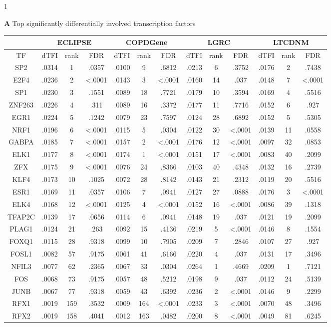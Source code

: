 \documentclass[9pt,twocolumn,twoside]{pnas-new}
\begin{document}
\begin{table}
1
\begin{widetext}

\textbf{A} Top significantly differentially involved transcription factors

\begin{tabular}{|c||c|c|c||c|c|c||c|c|c||c|c|c|}
\cline{2-13} 
\multicolumn{1}{c|}{} & \multicolumn{3}{c||}{ECLIPSE} & \multicolumn{3}{c||}{COPDGene} & \multicolumn{3}{c||}{LGRC} & \multicolumn{3}{c|}{LTCDNM}\tabularnewline
\hline 
TF & dTFI & rank & FDR & dTFI & rank & FDR & dTFI & rank & FDR & dTFI & rank & FDR\tabularnewline
\hline 
\hline 
SP2 & .0314 &  1 & .0357 & .0100 &  9 & .6812 & .0213 &  6 & .3752 & .0176 &  2 & .7438\tabularnewline
\hline 
E2F4 & .0236 &  2 & <.0001 & .0143 &  3 & <.0001 & .0160 & 14 & .037 & .0148 &  7 & <.0001\tabularnewline
\hline 
SP1 & .0230 &  3 & .1551 & .0089 &  18 & .7721 & .0179 & 10 & .3594 & .0169 &  4 & .5516\tabularnewline
\hline 
ZNF263 & .0226 &  4 & .311 & .0089 &  16 & .3372 & .0177 & 11 & .7716 & .0152 &  6 & .927\tabularnewline
\hline 
EGR1 & .0224 &  5 & .1242 & .0079 &  23 & .7597 & .0124 & 28 & .6892 & .0152 &  5 & .5305\tabularnewline
\hline 
NRF1 & .0196 &  6 & <.0001 & .0115 &  5 & .0304 & .0122 & 30 & <.0001 & .0139 & 11 & .0558\tabularnewline
\hline 
GABPA & .0185 &  7 & <.0001 & .0157 &  2 & <.0001 & .0176 & 12 & <.0001 & .0097 & 32 & .0853\tabularnewline
\hline 
ELK1 & .0177 &  8 & <.0001 & .0174 &  1 & <.0001 & .0151 & 17 & <.0001 & .0083 & 40 & .2099\tabularnewline
\hline 
ZFX & .0175 &  9 & <.0001 & .0076 &  24 & .8366 & .0103 & 40 & .4348 & .0132 & 16 & .2739\tabularnewline
\hline 
KLF4 & .0173 &  10 & .1025 & .0072 &  28 & .8142 & .0143 & 21 & .2312 & .0119 & 20 & .5516\tabularnewline
\hline 
ESR1 & .0169 &  11 & .0357 & .0106 &  7 & .0941 & .0127 & 27 & .0888 & .0176 &  3 & <.0001\tabularnewline
\hline 
ELK4 & .0168 &  12 & <.0001 & .0125 &  4 & <.0001 & .0152 & 16 & <.0001 & .0086 & 39 & .1318\tabularnewline
\hline 
TFAP2C & .0139 &  17 & .0656 & .0114 &  6 & .0941 & .0148 & 19 & .037 & .0121 & 19 & .2099\tabularnewline
\hline 
PLAG1 & .0124 &  21 & .263 & .0092 &  15 & .4136 & .0219 &  5 & <.0001 & .0146 &  8 & .1554\tabularnewline
\hline 
FOXQ1 & .0115 &  28 & .9318 & .0099 &  10 & .7905 & .0209 &  7 & .2846 & .0107 & 27 & .927\tabularnewline
\hline 
FOSL1 & .0082 &  57 & .9175 & .0061 &  41 & .6166 & .0220 &  4 & .037 & .0131 & 17 & .3496\tabularnewline
\hline 
NFIL3 & .0077 &  62 & .2365 & .0067 &  33 & .0304 & .0264 &  1 & .4669 & .0209 &  1 & .7121\tabularnewline
\hline 
FOS & .0068 &  73 & .9175 & .0057 &  48 & .5212 & .0198 &  9 & .037 & .0112 & 24 & .5139\tabularnewline
\hline 
JUNB & .0067 &  77 & .9318 & .0059 &  43 & .6392 & .0236 &  2 & <.0001 & .0146 &  9 & .2299\tabularnewline
\hline 
RFX1 & .0019 & 159 & .3532 & .0009 & 164 & <.0001 & .0233 &  3 & <.0001 & .0070 & 48 & .3496\tabularnewline
\hline 
RFX2 & .0019 & 158 & .4041 & .0012 & 163 & .0482 & .0200 &  8 & <.0001 & .0049 & 81 & .6245\tabularnewline
\hline 
\end{tabular}


\end{widetext}
\end{table}
\end{document}
